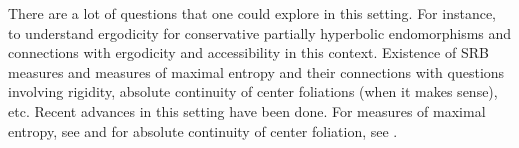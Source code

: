 \documentclass[12pt,reqno]{amsart}
\numberwithin{equation}{section}
\theoremstyle{plain}
\theoremstyle{remark}
\begin{document}
There are a lot of questions that one could explore in this setting. For instance, to understand ergodicity for conservative partially hyperbolic endomorphisms and connections with ergodicity and accessibility in this context. Existence of SRB measures and measures of maximal entropy and their connections with questions involving rigidity, absolute continuity of center foliations (when it makes sense), etc. Recent advances in this setting have been done. For measures of maximal entropy, see \cite{cant} and for absolute continuity of center foliation, see \cite{micnovo}.








\end{document}
